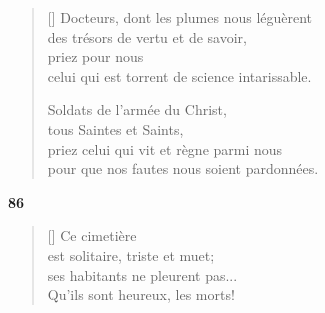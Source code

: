 \documentclass[a4paper,12pt]{book}
\begin{document}
\begin{verse}[\versewidth]
  Docteurs, dont les plumes nous léguèrent \\
  des trésors de vertu et de savoir, \\
  priez pour nous \\
  celui qui est torrent de science intarissable.

  Soldats de l'armée du Christ, \\
  tous Saintes et Saints, \\
  priez celui qui vit et règne parmi nous \\
  pour que nos fautes nous soient pardonnées.
\end{verse}

\bigskip

\begin{center}
  \textbf{86}
\end{center}

\settowidth{\versewidth}{ses habitants ne pleurent pas}


\begin{verse}[\versewidth]
  Ce cimetière \\
  est solitaire, triste et muet; \\
  ses habitants ne pleurent pas... \\
  Qu'ils sont heureux, les morts!
\end{verse}

\bigskip

\tableofcontents
\end{document}
